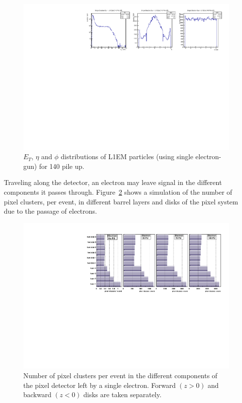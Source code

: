 \begin{figure}[!htb]
  \centering
  \includegraphics[scale=0.8]{../SimulationTools/L1EM_EtEtaPhi_140PileUP.pdf}
  \caption{$E_{T}$, $\eta$ and $\phi$ distributions of L1EM particles (using single electron-gun) for 140 pile up.}
  \label{fig:L1EM_EtEtaPhi_140PileUP}
\end{figure}

Traveling along the detector, an electron may leave signal in the different components it passes through.
Figure~\ref{fig:Number_of_pixel_clusters} shows a simulation of the number of pixel clusters, per event, in different
barrel layers and disks of the pixel system due to the passage of electrons.

\begin{figure}[!htb]
  \centering
  \includegraphics[scale=0.8]{../SimulationTools/Number_of_pixel_clusters.pdf}
  \caption{Number of pixel clusters per event in the different components of the pixel detector left by a single electron.
    Forward $(z>0)$ and backward $(z<0)$ disks are taken separately.}
  \label{fig:Number_of_pixel_clusters}
\end{figure}

\clearpage
